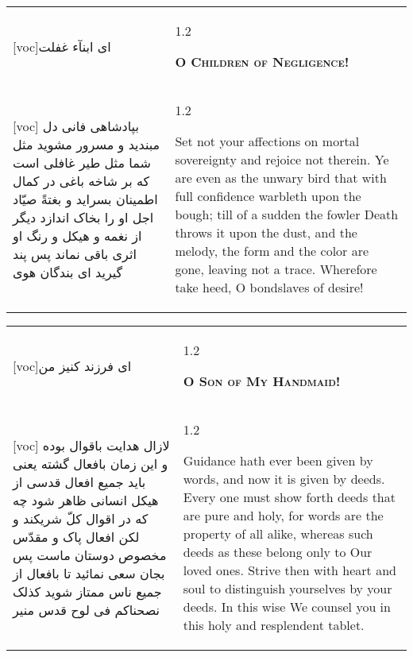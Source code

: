\documentclass[11pt]{article}
\makeatletter
\newenvironment{orig}
  {\begin{farsi}[voc]}
  {\end{farsi}}
\newenvironment{trans}
  {\Large\begin{spacing}{1.2}\raggedright}
  {\end{spacing}}
\newenvironment{word}
  {\begin{tabular}[t]{p{2.75in}@{\hspace{3em}}p{2.75in}}}
  {\end{tabular}}
\newcommand{\ayat}[2]{\begin{orig}#1\end{orig} & \begin{trans}#2\end{trans}}
\newcommand{\heading}[2]{\textsc{\textbf{#1}} %
}
\makeatother
\begin{document}
\pagebreak

\begin{word}
\ayat{ای ابنآء غفلت}{\heading{O Children of Negligence!}{}} \\ \ayat{
بپادشاهی فانی دل مبنديد و مسرور مشويد
مثل شما مثل طير غافلی است که بر شاخه باغی در کمال اطمينان بسرايد و بغتةً صيّاد اجل او را بخاک اندازد ديگر از نغمه و هيکل و رنگ او اثری باقی نماند
پس پند گيريد ای بندگان هوی
}{
  Set not your affections on mortal sovereignty and rejoice not therein. Ye
  are even as the unwary bird that with full confidence warbleth upon the
  bough; till of a sudden the fowler Death throws it upon the dust, and the
  melody, the form and the color are gone, leaving not a trace. Wherefore take
  heed, O bondslaves of desire!
}
\end{word}

\pagebreak

\begin{word}
\ayat{ای فرزند کنيز من}{\heading{O Son of My Handmaid!}{}} \\ \ayat{
لازال هدايت باقوال بوده و اين زمان بافعال گشته
يعنی بايد جميع افعال قدسی از هيکل انسانی ظاهر شود چه که در اقوال کلّ شريکند و لکن افعال پاک و مقدّس مخصوص دوستان ماست
پس بجان سعی نمائيد تا بافعال از جميع ناس ممتاز شويد
کذلک نصحناکم فی لوح قدس منير
}{
  Guidance hath ever been given by words, and now it is given by deeds. Every
  one must show forth deeds that are pure and holy, for words are the property
  of all alike, whereas such deeds as these belong only to Our loved ones.
  Strive then with heart and soul to distinguish yourselves by your deeds. In
  this wise We counsel you in this holy and resplendent tablet.
}
\end{word}

\pagebreak
\end{document}
